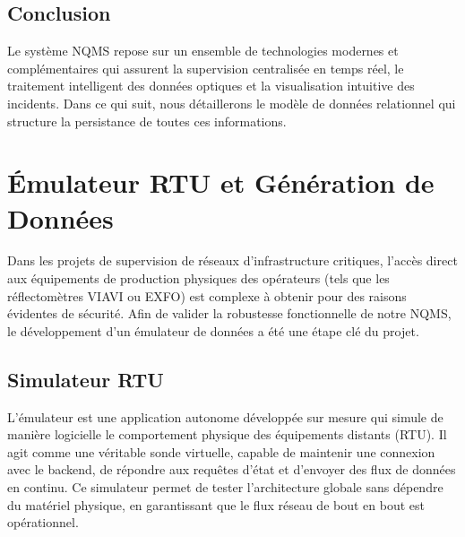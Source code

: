 \documentclass[11pt,a4paper]{article}
\begin{document}
\subsection{Conclusion}
Le système NQMS repose sur un ensemble de technologies modernes et complémentaires qui assurent la supervision centralisée en temps réel, le traitement intelligent des données optiques et la visualisation intuitive des incidents. Dans ce qui suit, nous détaillerons le modèle de données relationnel qui structure la persistance de toutes ces informations.

\newpage





\section{Émulateur RTU et Génération de Données}
Dans les projets de supervision de réseaux d'infrastructure critiques, l'accès direct aux équipements de production physiques des opérateurs (tels que les réflectomètres VIAVI ou EXFO) est complexe à obtenir pour des raisons évidentes de sécurité. Afin de valider la robustesse fonctionnelle de notre NQMS, le développement d'un émulateur de données a été une étape clé du projet.

\subsection{Simulateur RTU}
L'émulateur est une application autonome développée sur mesure qui simule de manière logicielle le comportement physique des équipements distants (RTU). Il agit comme une véritable sonde virtuelle, capable de maintenir une connexion avec le backend, de répondre aux requêtes d'état et d'envoyer des flux de données en continu. Ce simulateur permet de tester l'architecture globale sans dépendre du matériel physique, en garantissant que le flux réseau de bout en bout est opérationnel.
\end{document}
